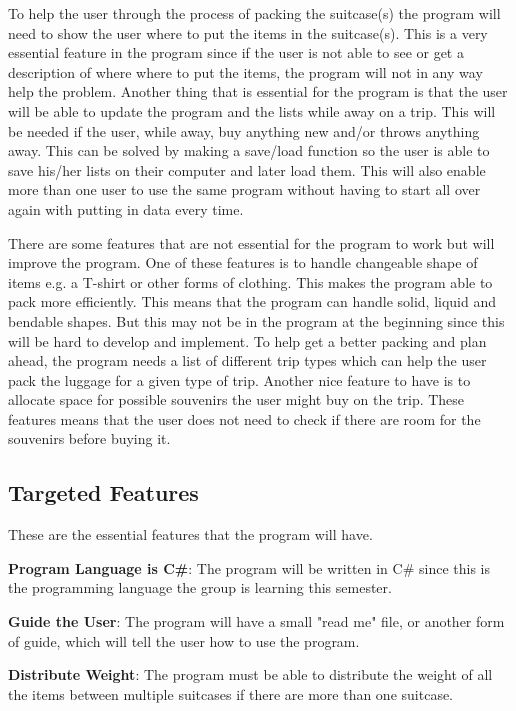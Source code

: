 To help the user through the process of packing the suitcase(s) the program will need to show the user where to put the items in the suitcase(s). This is a very essential feature in the program since if the user is not able to see or get a description of where where to put the items, the program will not in any way help the problem.
Another thing that is essential for the program is that the user will be able to update the program and the lists while away on a trip. This will be needed if the user, while away, buy anything new and/or throws anything away. This can be solved by making a save/load function so the user is able to save his/her lists on their computer and later load them. This will also enable more than one user to use the same program without having to start all over again with putting in data every time.  

There are some features that are not essential for the program to work but will improve the program. 
One of these features is to handle changeable shape of items e.g. a T-shirt or other forms of clothing. This makes the program able to pack more efficiently. This means that the program can handle solid, liquid and bendable shapes. But this may not be in the program at the beginning since this will be hard to develop and implement.
To help get a better packing and plan ahead, the program needs a list of different trip types which can help the user pack the luggage for a given type of trip.
Another nice feature to have is to allocate space for possible souvenirs the user might buy on the trip. These features means that the user does not need to check if there are room for the souvenirs before buying it.

\subsection{Targeted Features}
These are the essential features that the program will have.

\textbf{Program Language is C\#}:
The program will be written in C\# since this is the programming language the group is learning this semester.
\newline

\textbf{Guide the User}:
The program will have a small "read me" file, or another form of guide, which will tell the user how to use the program.
\newline

\textbf{Distribute Weight}:
The program must be able to distribute the weight of all the items between multiple suitcases if there are more than one suitcase.
\newline

